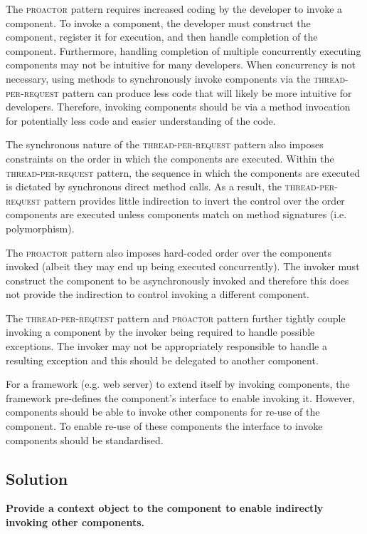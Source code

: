 \documentclass[prodmode]{style/acmlarge}
\begin{document}
The \textsc{proactor} pattern requires increased coding by the developer to
invoke a component.  To invoke a component, the developer must construct the
component, register it for execution, and then handle completion of the
component.  Furthermore, handling completion of multiple concurrently executing
components may not be intuitive for many developers.  When concurrency is not
necessary, using methods to synchronously invoke components via the
\textsc{thread-per-request} pattern can produce less code that will likely be
more intuitive for developers.  Therefore, invoking components should be via a
method invocation for potentially less code and easier understanding of the
code.

The synchronous nature of the \textsc{thread-per-request} pattern also imposes
constraints on the order in which the components are executed.  Within the
\textsc{thread-per-request} pattern, the sequence in which the components are
executed is dictated by synchronous direct method calls.  As a result, the
\textsc{thread-per-request} pattern provides little indirection to invert the
control over the order components are executed unless components match on method
signatures (i.e. polymorphism).

The \textsc{proactor} pattern also imposes hard-coded order over the components
invoked (albeit they may end up being executed concurrently).  The invoker must
construct the component to be asynchronously invoked and therefore this does not
provide the indirection to control invoking a different component.

The \textsc{thread-per-request} pattern and \textsc{proactor} pattern further
tightly couple invoking a component by the invoker being required to handle
possible exceptions.  The invoker may not be appropriately responsible to handle
a resulting exception and this should be delegated to another component.

For a framework (e.g. web server) to extend itself by invoking components, the
framework pre-defines the component's interface to enable invoking it.  However,
components should be able to invoke other components for re-use of the
component.  To enable re-use of these components the interface to invoke
components should be standardised.


\subsection{Solution}

\textbf{Provide a context object to the component to enable indirectly invoking other components.}
\end{document}
